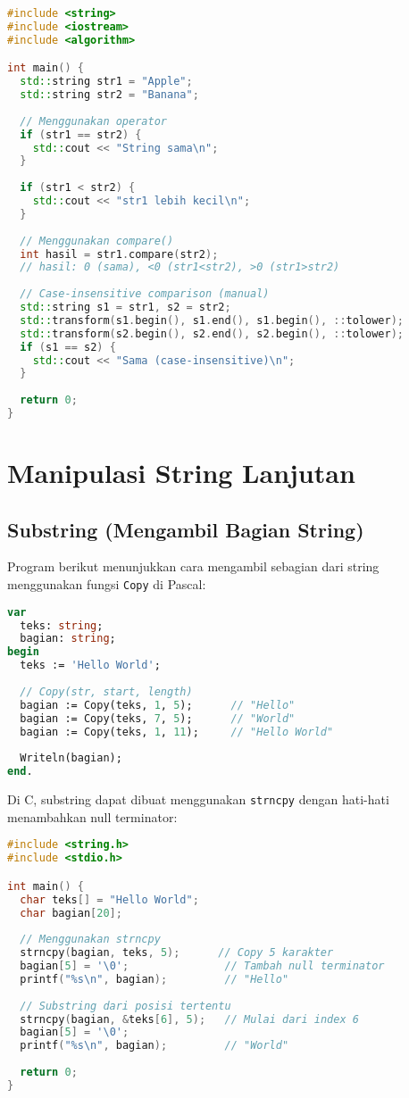 \documentclass[../main.tex]{subfiles}
\begin{document}
\begin{lstlisting}[language=C++, caption={Perbandingan di C++}]
#include <string>
#include <iostream>
#include <algorithm>

int main() {
  std::string str1 = "Apple";
  std::string str2 = "Banana";
  
  // Menggunakan operator
  if (str1 == str2) {
    std::cout << "String sama\n";
  }
  
  if (str1 < str2) {
    std::cout << "str1 lebih kecil\n";
  }
  
  // Menggunakan compare()
  int hasil = str1.compare(str2);
  // hasil: 0 (sama), <0 (str1<str2), >0 (str1>str2)
  
  // Case-insensitive comparison (manual)
  std::string s1 = str1, s2 = str2;
  std::transform(s1.begin(), s1.end(), s1.begin(), ::tolower);
  std::transform(s2.begin(), s2.end(), s2.begin(), ::tolower);
  if (s1 == s2) {
    std::cout << "Sama (case-insensitive)\n";
  }
  
  return 0;
}
\end{lstlisting}

\section{Manipulasi String Lanjutan}

\subsection{Substring (Mengambil Bagian String)}

Program berikut menunjukkan cara mengambil sebagian dari string menggunakan fungsi \texttt{Copy} di Pascal:

\begin{lstlisting}[language=Pascal, caption={Substring di Pascal}]
var
  teks: string;
  bagian: string;
begin
  teks := 'Hello World';
  
  // Copy(str, start, length)
  bagian := Copy(teks, 1, 5);      // "Hello"
  bagian := Copy(teks, 7, 5);      // "World"
  bagian := Copy(teks, 1, 11);     // "Hello World"
  
  Writeln(bagian);
end.
\end{lstlisting}

Di C, substring dapat dibuat menggunakan \texttt{strncpy} dengan hati-hati menambahkan null terminator:

\begin{lstlisting}[language=C, caption={Substring di C}]
#include <string.h>
#include <stdio.h>

int main() {
  char teks[] = "Hello World";
  char bagian[20];
  
  // Menggunakan strncpy
  strncpy(bagian, teks, 5);      // Copy 5 karakter
  bagian[5] = '\0';               // Tambah null terminator
  printf("%s\n", bagian);         // "Hello"
  
  // Substring dari posisi tertentu
  strncpy(bagian, &teks[6], 5);   // Mulai dari index 6
  bagian[5] = '\0';
  printf("%s\n", bagian);         // "World"
  
  return 0;
}
\end{lstlisting}
\end{document}
